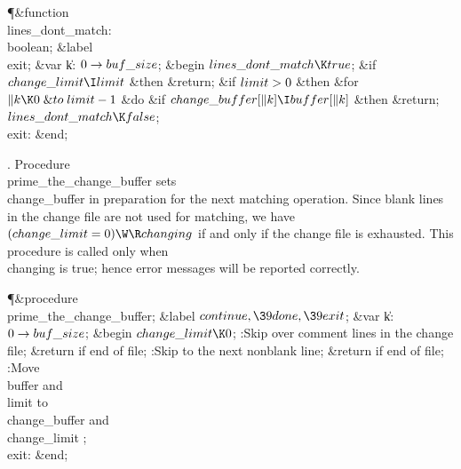 \Y\P\4\&{function}\1\  \\{lines\_dont\_match}: \\{boolean};\6
\4\&{label} \\{exit};\6
\4\&{var} \|k: $0\to\\{buf\_size}$;\2\6
\&{begin} $\\{lines\_dont\_match}\K\\{true}$;\6
\&{if} $\\{change\_limit}\I\\{limit}$ \1\&{then}\5
\&{return};\2\6
\&{if} $\\{limit}>0$ \1\&{then}\6
\&{for} $\|k\K0\mathrel{\&{to}}\\{limit}-1$ \1\&{do}\6
\&{if} $\\{change\_buffer}[\|k]\I\\{buffer}[\|k]$ \1\&{then}\5
\&{return};\2\2\2\6
$\\{lines\_dont\_match}\K\\{false}$;\6
\4\\{exit}: \&{end};\par
\fi

. Procedure \\{prime\_the\_change\_buffer} sets \\{change\_buffer} in
preparation
for the next matching operation. Since blank lines in the change file are
not used for matching, we have $(\\{change\_limit}=0)\W\R\\{changing}$ if and
only if the change file is exhausted. This procedure is called only
when \\{changing} is true; hence error messages will be reported correctly.

\Y\P\4\&{procedure}\1\  \\{prime\_the\_change\_buffer};\6
\4\&{label} $\\{continue},\39\\{done},\39\\{exit}$;\6
\4\&{var} \|k: $0\to\\{buf\_size}$;\2\6
\&{begin} $\\{change\_limit}\K0$;\6
:Skip over comment lines in the change file; \&{return} if end of file\X;\6
:Skip to the next nonblank line; \&{return} if end of file\X;\6
:Move \\{buffer} and \\{limit} to \\{change\_buffer} and \\{change\_limit}%
\X;\6
\4\\{exit}: \&{end};\par
\fi

